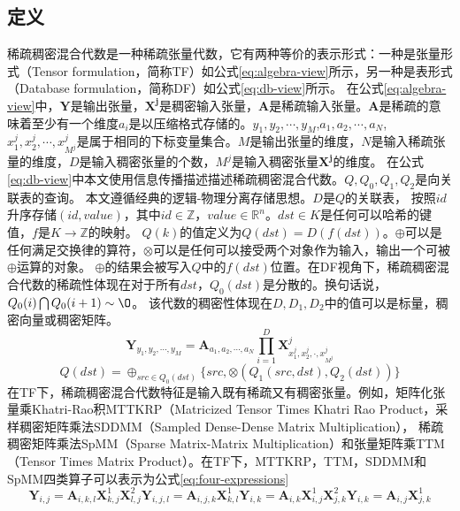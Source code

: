 \subsection{定义}
稀疏稠密混合代数是一种稀疏张量代数，它有两种等价的表示形式：一种是张量形式（Tensor formulation，简称TF）如公式\eqref{eq:algebra-view}所示，另一种是表形式（Database formulation，简称DF）如公式\eqref{eq:db-view}所示。
在公式\eqref{eq:algebra-view}中，$\symbf{Y}$是输出张量，$\symbf{X^j}$是稠密输入张量，$\symbf{A}$是稀疏输入张量。$\symbf{A}$是稀疏的意味着至少有一个维度$a_i$是以压缩格式存储的。$y_1, y_2,\cdots,y_M$,$a_1, a_2,\cdots,a_N$,$x_1^j,x_2^j,\cdots,x_{M^j}^j$是属于相同的下标变量集合。$M$是输出张量的维度，$N$是输入稀疏张量的维度，$D$是输入稠密张量的个数，$M^j$是输入稠密张量$\symbf{X^j}$的维度。
在公式\eqref{eq:db-view}中本文使用信息传播描述描述稀疏稠密混合代数。$Q,Q_0,Q_1,Q_2$是向关联表的查询。
本文遵循经典的逻辑-物理分离存储思想\cite{codd1970relational}。$D$是$Q$的关联表，
按照$id$升序存储$(id, value)$，其中$id\in \mathbb{Z}$，$value \in \mathbb{R}^n$。$dst\in K$是任何可以哈希的键值，$f$是$K\rightarrow \mathbb{Z}$的映射。
$Q(k)$的值定义为$Q(dst)=D(f(dst))$。$\oplus$可以是任何满足交换律的算符，$\otimes$可以是任何可以接受两个对象作为输入，输出一个可被$\oplus$运算的对象。
$\oplus$的结果会被写入$Q$中的$f(dst)$位置。在DF视角下，稀疏稠密混合代数的稀疏性体现在对于所有$dst$，$Q_0(dst)$是分散的。换句话说，$Q_0(i) \bigcap Q_0(i+1) \sim \O$。
该代数的稠密性体现在$D,D_1,D_2$中的值可以是标量，稠密向量或稠密矩阵。
\begin{equation}
  \symbf{Y}_{y_1, y_2,\cdots,y_M} = \symbf{A}_{a_1, a_2,\cdots,a_N}\prod_{i=1}^{D}\symbf{X}^{j}_{x_1^j,x_2^j,\cdot,x_{M^j}^j}
  \label{eq:algebra-view}
\end{equation}
\begin{equation}
  Q(dst)=\oplus_{src\in Q_0(dst)}\{src, \otimes(Q_1(src,dst), Q_2(dst))\}
  \label{eq:db-view}
\end{equation}
在TF下，稀疏稠密混合代数特征是输入既有稀疏又有稠密张量。例如，矩阵化张量乘Khatri-Rao积MTTKRP（Matricized Tensor Times Khatri Rao Product\cite{nisa2019mttkrp}，采样稠密矩阵乘法SDDMM（Sampled Dense-Dense Matrix Multiplication）\cite{yu2021exploiting}，
稀疏稠密矩阵乘法SpMM（Sparse Matrix-Matrix Multiplication）\cite{huang2020ge}和张量矩阵乘TTM（Tensor Times Matrix Product）\cite{kurt2022ttm}。在TF下，MTTKRP，TTM，SDDMM和SpMM四类算子可以表示为公式\eqref{eq:four-expressions}
\begin{subequations}
  \begin{equation}
      \symbf{Y}_{i,j} = \symbf{A}_{i,k,l}\symbf{X}_{k,j}^1\symbf{X}_{l,j}^2
  \end{equation}
  \begin{equation}
      \symbf{Y}_{i,j,l} = \symbf{A}_{i,j,k}\symbf{X}_{k,l}^1
  \end{equation}
  \begin{equation}
      \symbf{Y}_{i,k} = \symbf{A}_{i,k}\symbf{X}_{i,j}^1\symbf{X}_{j,k}^2
  \end{equation}
  \begin{equation}
      \symbf{Y}_{i,k} = \symbf{A}_{i,j}\symbf{X}_{j,k}^1
  \end{equation}
  \label{eq:four-expressions}
\end{subequations}
